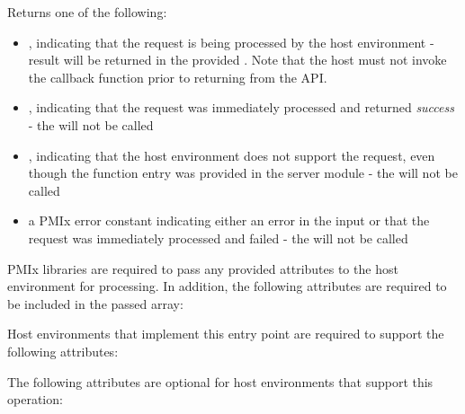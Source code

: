 \begin{arglist}
\end{arglist}

Returns one of the following:

\begin{itemize}
    \item {}, indicating that the request is being processed by the host environment - result will be returned in the provided . Note that the host must not invoke the callback function prior to returning from the \ac{API}.
    \item {}, indicating that the request was immediately processed and returned \textit{success} - the  will not be called
    \item {}, indicating that the host environment does not support the request, even though the function entry was provided in the server module - the  will not be called
    \item a PMIx error constant indicating either an error in the input or that the request was immediately processed and failed - the  will not be called
\end{itemize}

\reqattrstart
\ac{PMIx} libraries are required to pass any provided attributes to the host environment for processing. In addition, the following attributes are required to be included in the passed  array:


\divider

Host environments that implement this entry point are required to support the following attributes:


\reqattrend

\optattrstart
The following attributes are optional for host environments that support this operation:


